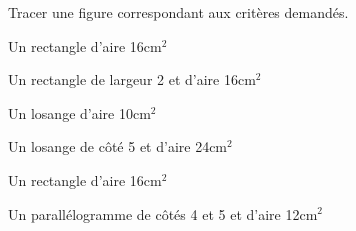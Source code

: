  Tracer une figure correspondant aux critères demandés.

\begin{multicols}{3}

    Un rectangle d'aire 16cm$^2$


   Un rectangle de largeur 2 et d'aire 16cm$^2$


    Un losange d'aire 10cm$^2$


    Un losange de côté 5 et d'aire 24cm$^2$


    Un rectangle d'aire 16cm$^2$


    Un parallélogramme de côtés 4 et 5 et d'aire 12cm$^2$
\end{multicols}
